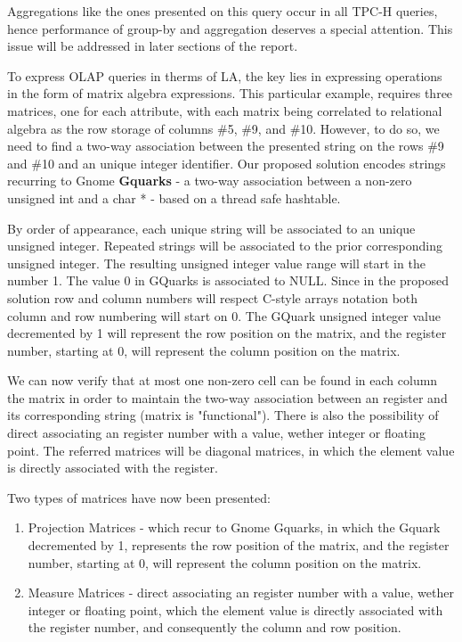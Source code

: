 Aggregations like the ones presented on this query occur in all TPC-H queries, hence performance of group-by and aggregation deserves a special attention.
This issue will be addressed in later sections of the report.\par 
To express OLAP queries in therms of LA, the key lies in expressing operations in the form of matrix algebra expressions. 
This particular example, requires three matrices, one for each attribute, with each matrix being correlated to relational algebra as the row storage of columns \#5, \#9, and \#10. However, to do so, we need to find a two-way association between the presented string on the rows \#9 and \#10 and an unique integer identifier. Our proposed solution encodes strings recurring to Gnome \textbf{Gquarks} - a two-way association between a non-zero unsigned int and a char * - based on a thread safe hashtable. \par 
By order of appearance, each unique string will be associated to an unique unsigned integer. Repeated strings will be associated to the prior corresponding unsigned integer. The resulting unsigned integer value range will start in the number 1. The value 0 in GQuarks is associated to NULL. Since in the proposed solution row and column numbers will respect  C-style arrays notation both column and row numbering will start on 0. The GQuark unsigned integer value decremented by 1  will represent the row position on the matrix, and the register number, starting at 0, will represent the column position on the matrix. \par 
We can now verify that at most one non-zero cell can be found in each column the matrix in order to maintain the two-way association between an register and its corresponding string (matrix is "functional"). There is also the possibility of direct associating an register number with a value, wether integer or floating point. The referred matrices will be diagonal matrices, in which the element value is directly associated with the register.\par 
Two types of matrices have now been presented:
\label{definition_matrices}
\begin{enumerate}
\item Projection Matrices - which recur to Gnome Gquarks, in which the Gquark decremented by 1, represents the row position of the matrix, and the register number, starting at 0, will represent the column position on the matrix.
\item Measure Matrices -  direct associating an register number with a value, wether integer or floating point,  which the element value is directly associated with the register number, and consequently the column and row position.
\end{enumerate}
 
